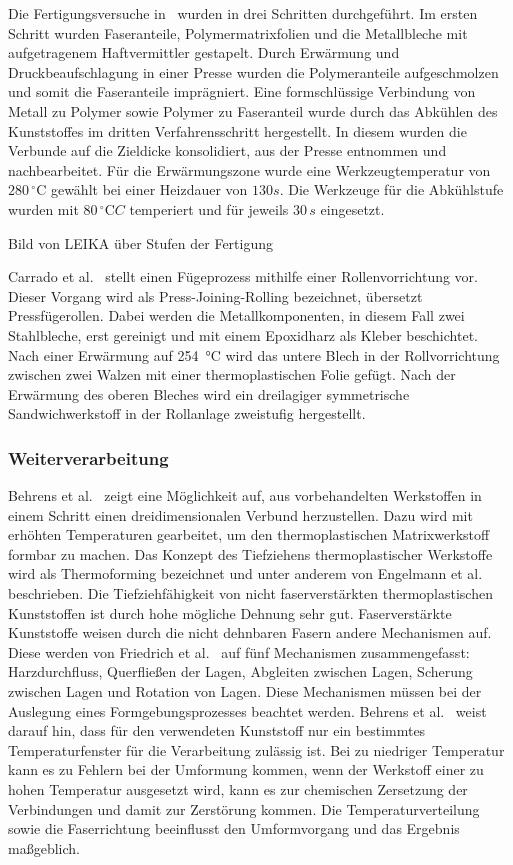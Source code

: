 Die Fertigungsversuche in~\cite{Wiedemann2017} wurden in drei Schritten durchgeführt.
Im ersten Schritt wurden Faseranteile, Polymermatrixfolien und die Metallbleche mit aufgetragenem Haftvermittler gestapelt.
Durch Erwärmung und Druckbeaufschlagung in einer Presse wurden die Polymeranteile aufgeschmolzen und somit die Faseranteile imprägniert.
Eine formschlüssige Verbindung von Metall zu Polymer sowie Polymer zu Faseranteil wurde durch das Abkühlen des Kunststoffes im dritten Verfahrensschritt hergestellt.
In diesem wurden die Verbunde auf die Zieldicke konsolidiert, aus der Presse entnommen und nachbearbeitet.
Für die Erwärmungszone wurde eine Werkzeugtemperatur von $280\, ^\circ \text{C}$ gewählt bei einer Heizdauer von $130 s$.
Die Werkzeuge für die Abkühlstufe wurden mit $80\, ^\circ\text{C} C$ temperiert und für jeweils $30\, s$ eingesetzt\cite{Wiedemann2017}.

Bild von LEIKA über Stufen der Fertigung

Carrado et al.~\cite{Carrado2010} stellt einen Fügeprozess mithilfe einer Rollenvorrichtung vor.
Dieser Vorgang wird als Press-Joining-Rolling bezeichnet, übersetzt Pressfügerollen.
Dabei werden die Metallkomponenten, in diesem Fall zwei Stahlbleche, erst gereinigt und mit einem Epoxidharz als Kleber beschichtet.
Nach einer Erwärmung auf \SI{254}{\degreeCelsius} wird das untere Blech in der Rollvorrichtung zwischen zwei Walzen mit einer thermoplastischen Folie gefügt.
Nach der Erwärmung des oberen Bleches wird ein dreilagiger symmetrische Sandwichwerkstoff in der Rollanlage zweistufig hergestellt.

\subsubsection{Weiterverarbeitung}

Behrens et al.~\cite{Behrens2014} zeigt eine Möglichkeit auf, aus vorbehandelten Werkstoffen in einem Schritt einen dreidimensionalen Verbund herzustellen.
Dazu wird mit erhöhten Temperaturen gearbeitet, um den thermoplastischen Matrixwerkstoff formbar zu machen.
Das Konzept des Tiefziehens thermoplastischer Werkstoffe wird als Thermoforming bezeichnet und unter anderem von Engelmann et al.~\cite{Engelmann2012} beschrieben.
Die Tiefziehfähigkeit von nicht faserverstärkten thermoplastischen Kunststoffen ist durch hohe mögliche Dehnung sehr gut.
Faserverstärkte Kunststoffe weisen durch die nicht dehnbaren Fasern andere Mechanismen auf.
Diese werden von Friedrich et al.~\cite{Friedrich1997} auf fünf Mechanismen zusammengefasst: Harzdurchfluss, Querfließen der Lagen, Abgleiten zwischen Lagen, Scherung zwischen Lagen und Rotation von Lagen.
Diese Mechanismen müssen bei der Auslegung eines Formgebungsprozesses beachtet werden.
Behrens et al.~\cite{Behrens2014} weist darauf hin, dass für den verwendeten Kunststoff nur ein bestimmtes Temperaturfenster für die Verarbeitung zulässig ist.
Bei zu niedriger Temperatur kann es zu Fehlern bei der Umformung kommen, wenn der Werkstoff einer zu hohen Temperatur ausgesetzt wird, kann es zur chemischen Zersetzung der Verbindungen und damit zur Zerstörung kommen.
Die Temperaturverteilung sowie die Faserrichtung beeinflusst den Umformvorgang und das Ergebnis maßgeblich.


